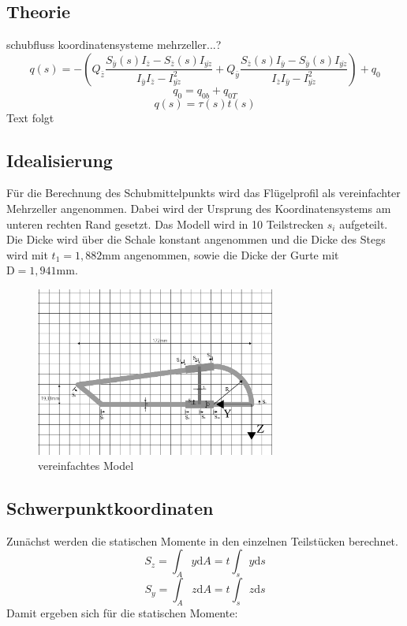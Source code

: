 
\subsection{Theorie}
schubfluss
koordinatensysteme
mehrzeller...?
\begin{equation}\label{qs}
	q(s)=-(Q_{\bar{z}}\frac{S_{\bar{y}}(s)I_{\bar{z}}-S_{\bar{z}}(s)I_{\bar{yz}}}{I_{\bar{y}}I_{\bar{z}}-I_{\bar{yz}}^2}+Q_{\bar{y}}\frac{S_{\bar{z}}(s)I_{\bar{y}}-S_{\bar{y}}(s)I_{\bar{yz}}}{I_{\bar{z}}I_{\bar{y}}-I_{\bar{yz}}^2})+q_0
\end{equation}
\begin{equation}
	q_{0} = q_{0b}+q_{0T}
\end{equation}
\begin{equation}\label{tau}
	q(s)=\tau(s)t(s)
\end{equation}
Text folgt
\subsection{Idealisierung}
Für die Berechnung des Schubmittelpunkts wird das Flügelprofil als vereinfachter Mehrzeller angenommen.
Dabei wird der Ursprung des Koordinatensystems am unteren rechten Rand gesetzt. Das Modell wird in 10 Teilstrecken $s_{i}$ aufgeteilt. Die Dicke wird über die Schale konstant angenommen und die Dicke des Stegs wird mit $t_{1}=1,882\mathrm{mm}$ angenommen, sowie die Dicke der Gurte mit $\mathrm{D}=1,941\mathrm{mm}$.
\begin{figure}[h]
 \centering
 \includegraphics[width=0.7\textwidth]{Bilder/Model1}
 \caption{vereinfachtes Model}
 \label{fig:Fluegel1}
\end{figure}
\subsection{Schwerpunktkoordinaten}\label{SP-Koord}
Zunächst werden die statischen Momente in den einzelnen Teilstücken berechnet.
\begin{equation}
	S_{z}=\int_{A}^{}y \mathrm{d}A =t\int_{s}^{}y \mathrm{d}s
\end{equation}
\begin{equation}
	S_{y}=\int_{A}^{}z \mathrm{d}A =t\int_{s}^{}z \mathrm{d}s 
\end{equation}
Damit ergeben sich für die statischen Momente:

